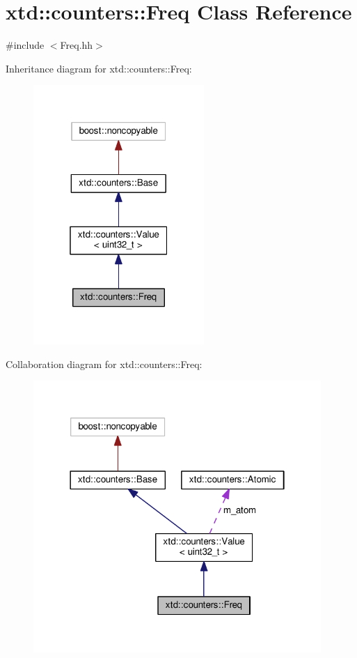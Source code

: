 \hypertarget{classxtd_1_1counters_1_1Freq}{}\section{xtd\+:\+:counters\+:\+:Freq Class Reference}
\label{classxtd_1_1counters_1_1Freq}


{\ttfamily \#include $<$Freq.\+hh$>$}



Inheritance diagram for xtd\+:\+:counters\+:\+:Freq\+:
\nopagebreak
\begin{figure}[H]
\begin{center}
\leavevmode
\includegraphics[width=184pt]{classxtd_1_1counters_1_1Freq__inherit__graph}
\end{center}
\end{figure}


Collaboration diagram for xtd\+:\+:counters\+:\+:Freq\+:
\nopagebreak
\begin{figure}[H]
\begin{center}
\leavevmode
\includegraphics[width=310pt]{classxtd_1_1counters_1_1Freq__coll__graph}
\end{center}
\end{figure}
